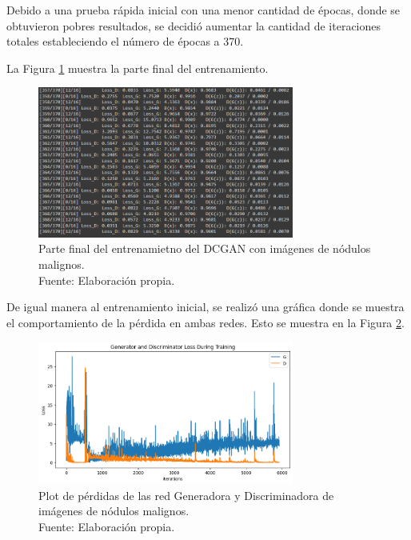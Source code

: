 Debido a una prueba rápida inicial con una menor cantidad de épocas, donde se obtuvieron pobres resultados, se decidió aumentar la cantidad de iteraciones totales estableciendo el número de épocas a 370.

La Figura \ref{4:fig116} muestra la parte final del entrenamiento.

\begin{figure}[H]
	\begin{center}
		\includegraphics[width=0.75\textwidth]{4/figures/dcgan_2_train.PNG}
		\caption[Parte final del entrenamietno del DCGAN con imágenes de nódulos malignos]{Parte final del entrenamietno del DCGAN con imágenes de nódulos malignos. \\
		Fuente: Elaboración propia.}
		\label{4:fig116}
	\end{center}
\end{figure}

De igual manera al entrenamiento inicial, se realizó una gráfica donde se muestra el comportamiento de la pérdida en ambas redes. Esto se muestra en la Figura \ref{4:fig117}.

\begin{figure}[H]
	\begin{center}
		\includegraphics[width=0.75\textwidth]{4/figures/plot_loss_2.png}
		\caption[Plot de pérdidas de las red Generadora y Discriminadora de imágenes de nódulos malignos]{Plot de pérdidas de las red Generadora y Discriminadora de imágenes de nódulos malignos. \\
		Fuente: Elaboración propia.}
		\label{4:fig117}
	\end{center}
\end{figure}


